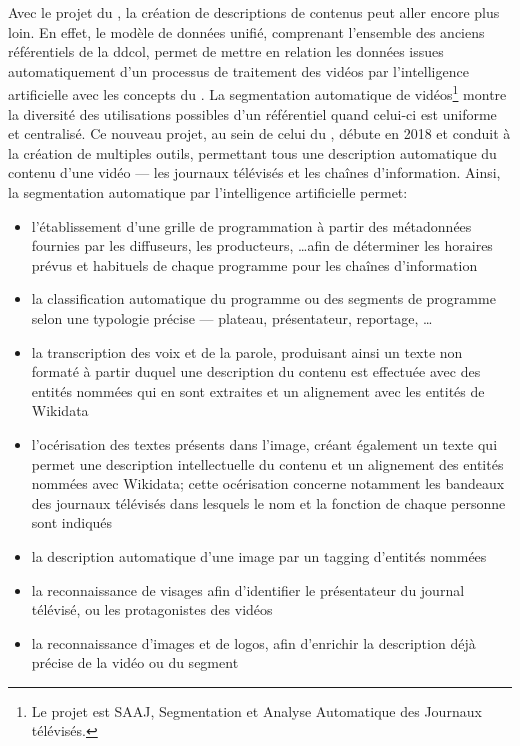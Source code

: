 Avec le projet du \ldd, la création de descriptions de contenus peut aller encore plus loin. En effet, le modèle de données unifié, comprenant l'ensemble des anciens référentiels de la \ac{ddcol}, permet de mettre en relation les données issues automatiquement d'un processus de traitement des vidéos par l'intelligence artificielle avec les concepts du \ldd. La segmentation automatique de vidéos\footnote{Le projet est SAAJ, Segmentation et Analyse Automatique des Journaux télévisés.} montre la diversité des utilisations possibles d'un référentiel quand celui-ci est uniforme et centralisé. Ce nouveau projet, au sein de celui du \ldd, débute en 2018 et conduit à la création de multiples outils, permettant tous une description automatique du contenu d'une vidéo --- les journaux télévisés et les chaînes d'information. Ainsi, la segmentation automatique par l'intelligence artificielle permet:
\begin{itemize}
	\item l'établissement d'une grille de programmation à partir des métadonnées fournies par les diffuseurs, les producteurs, \dots afin de déterminer les horaires prévus et habituels de chaque programme pour les chaînes d'information
	\item la classification automatique du programme ou des segments de programme selon une typologie précise --- plateau, présentateur, reportage, \dots
	\item la transcription des voix et de la parole, produisant ainsi un texte non formaté à partir duquel une description du contenu est effectuée avec des entités nommées qui en sont extraites et un alignement avec les entités de Wikidata
	\item l'océrisation des textes présents dans l'image, créant également un texte qui permet une description intellectuelle du contenu et un alignement des entités nommées avec Wikidata; cette océrisation concerne notamment les bandeaux des journaux télévisés dans lesquels le nom et la fonction de chaque personne sont indiqués
	\item la description automatique d'une image par un tagging d'entités nommées
	\item la reconnaissance de visages afin d'identifier le présentateur du journal télévisé, ou les protagonistes des vidéos
	\item la reconnaissance d'images et de logos, afin d'enrichir la description déjà précise de la vidéo ou du segment
\end{itemize} 

